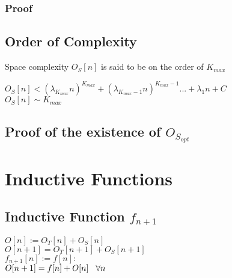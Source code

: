 \documentclass[11pt]{article}
\begin{document}
\subsubsection{Proof}








\subsection{Order of Complexity}
Space complexity $O_S[n]$ is said to be on the order of $K_{max}$
\begin{center}
$
O_S[n] < (\lambda_{K_{max}} n)^{K_{max}} + (\lambda_{K_{max}-1} n)^{K_{max}-1}... + \lambda_1 n + C
$
\\ \vspace{2mm}
$
O_S[n] \sim K_{max}
$
\end{center}




\subsection{Proof of the existence of $O_{S_{opt}}$}












\newpage
\section{Inductive Functions}














\subsection{Inductive Function $f_{n+1}$}
\begin{center}
\vspace{2mm}
$
O[n] := O_T[n] + O_S[n]
$
\\ \vspace{2mm}
$
O[n+1] = O_T[n+1] + O_S[n+1]
$
\\ \vspace{4mm}
$
f_{n+1}[n] := f[n] :
$
\\ \vspace{2mm}
$
O[n+1] = f[n] + O[n] \hspace{3mm} \forall n
$
\end{center}
\end{document}
